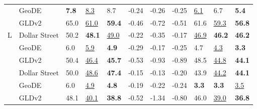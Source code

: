 \begin{table*}[h]
\begin{tabularx}{2\columnwidth}{@{}l|l|YYY|YYY|YYY@{}}
& GeoDE
&\bf7.8&\underline{8.3}&{8.7}&-0.24&-0.26&-0.25&\underline{6.1}&6.7&\bf5.4\\

& GLDv2
& 65.0&\underline{61.0}&\bf59.4&-0.46&-0.72&-0.51&61.6&\underline{59.3}&\bf56.8\\[5pt]

& Dollar Street
&50.2&\bf48.1&\underline{49.0}&-0.22&-0.35&-0.17&\underline{46.9}&\bf46.2&\bf46.2\\

& GeoDE 
& 6.0&\underline{5.9}&\bf4.9&-0.29&-0.17&-0.25&4.7&\underline{4.3}&\bf3.3\\

& GLDv2 
& 50.4&\underline{46.4}&\bf45.7&-0.53&-0.93&-0.89&48.5&\underline{44.8}&\bf44.1\\[5pt]

& Dollar Street
&50.0&\underline{48.6}&\bf47.4&-0.15&-0.13&-0.20&43.9&\underline{44.2}&\bf44.1\\
& GeoDE
&  6.0&\underline{4.9}&\bf4.8&-0.19&-0.22&-0.24&\bf3.3&\bf3.3&\underline{3.5}\\
& GLDv2 
&48.1&\underline{40.1}&\bf38.8&-0.52&-1.34&-0.80&46.0&\underline{39.0}&\bf36.8\\ \bottomrule
    \end{tabularx}
\end{table*}